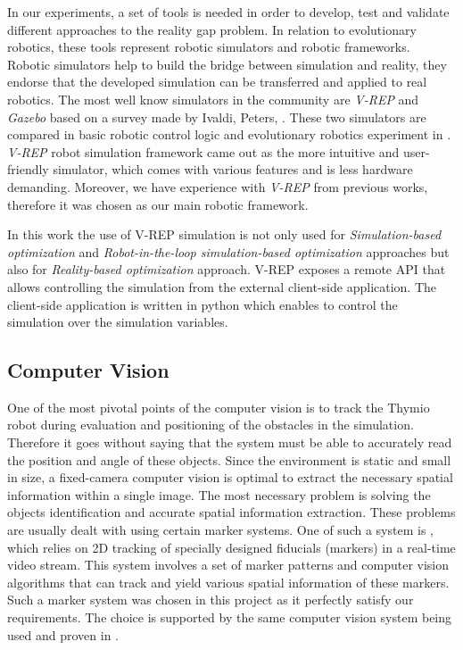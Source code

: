 In our experiments, a set of tools is needed in order to develop, test and validate different approaches to the reality gap problem. In relation to evolutionary robotics, these tools represent robotic simulators and robotic frameworks. Robotic simulators help to build the bridge between simulation and reality, they endorse that the developed simulation can be transferred and applied to real robotics. The most well know simulators in the community are \emph{V-REP} \cite{rohmer2013v} and \emph{Gazebo} \cite{koenig2004design} based on a survey made by Ivaldi, Peters, \cite{ivaldi2014tools}. These two simulators are compared in basic robotic control logic and evolutionary robotics experiment in \cite{nogueira2014comparative}. \emph{V-REP} robot simulation framework came out as the more intuitive and user-friendly simulator, which comes with various features and is less hardware demanding. Moreover, we have experience with \emph{V-REP} from previous works, therefore it was chosen as our main robotic framework.

In this work the use of V-REP simulation is not only used for \emph{Simulation-based optimization} and \emph{Robot-in-the-loop simulation-based optimization} approaches but also for \emph{Reality-based optimization} approach. V-REP exposes a remote API that allows controlling the simulation from the external client-side application. The client-side application is written in python which enables to control the simulation over the simulation variables.

\subsection{Computer Vision}

One of the most pivotal points of the computer vision is to track the Thymio robot during evaluation and positioning of the obstacles in the simulation. Therefore it goes without saying that the system must be able to accurately read the position and angle of these objects. Since the environment is static and small in size, a fixed-camera computer vision is optimal to extract the necessary spatial information within a single image. The most necessary problem is solving the objects identification and accurate spatial information extraction. These problems are usually dealt with using certain marker systems. One of such a system is \cite{bencina2005improved}, which relies on 2D tracking of specially designed fiducials (markers) in a real-time video stream. This system involves a set of marker patterns and computer vision algorithms that can track and yield various spatial information of these markers. Such a marker system was chosen in this project as it perfectly satisfy our requirements. The choice is supported by the same computer vision system being used and proven in \cite{faina2017automating}.

